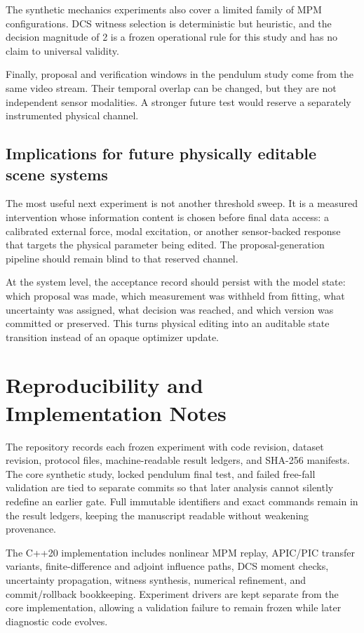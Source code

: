 \documentclass[acmtog]{acmart}
\begin{document}
The synthetic mechanics experiments also cover a limited family of MPM configurations. DCS witness selection is deterministic but heuristic, and the decision magnitude of 2 is a frozen operational rule for this study and has no claim to universal validity.

Finally, proposal and verification windows in the pendulum study come from the same video stream. Their temporal overlap can be changed, but they are not independent sensor modalities. A stronger future test would reserve a separately instrumented physical channel.

\subsection{Implications for future physically editable scene systems}\label{future-work}

The most useful next experiment is not another threshold sweep. It is a measured intervention whose information content is chosen before final data access: a calibrated external force, modal excitation, or another sensor-backed response that targets the physical parameter being edited. The proposal-generation pipeline should remain blind to that reserved channel.

At the system level, the acceptance record should persist with the model state: which proposal was made, which measurement was withheld from fitting, what uncertainty was assigned, what decision was reached, and which version was committed or preserved. This turns physical editing into an auditable state transition instead of an opaque optimizer update.

\section{Reproducibility and Implementation Notes}\label{reproducibility-and-implementation-notes}

The repository records each frozen experiment with code revision, dataset revision, protocol files, machine-readable result ledgers, and SHA-256 manifests. The core synthetic study, locked pendulum final test, and failed free-fall validation are tied to separate commits so that later analysis cannot silently redefine an earlier gate. Full immutable identifiers and exact commands remain in the result ledgers, keeping the manuscript readable without weakening provenance.

The C++20 implementation includes nonlinear MPM replay, APIC/PIC transfer variants, finite-difference and adjoint influence paths, DCS moment checks, uncertainty propagation, witness synthesis, numerical refinement, and commit/rollback bookkeeping. Experiment drivers are kept separate from the core implementation, allowing a validation failure to remain frozen while later diagnostic code evolves.
\end{document}
